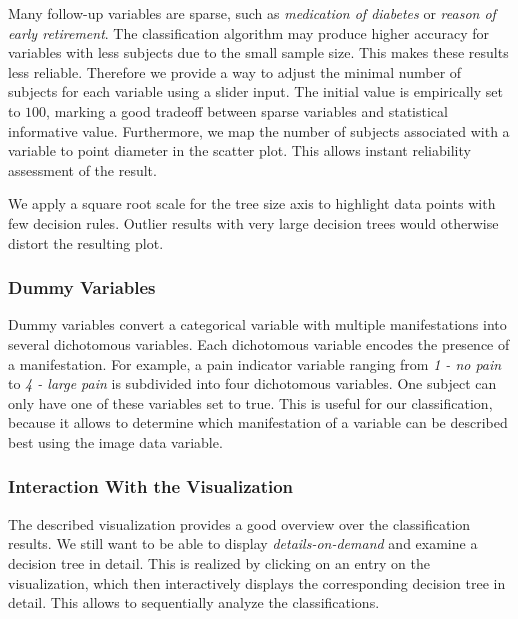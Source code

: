 \documentclass[a4paper,twoside]{style/article}
\newcommand{\com}[1]{\textcolor{orange}{\uline{#1}}}
\begin{document}
Many follow-up variables are sparse, such as \emph{medication of diabetes} or \emph{reason of early retirement}.
The classification algorithm may produce higher accuracy for variables with less subjects due to the small sample size.
This makes these results less reliable.
Therefore we provide a way to adjust the minimal number of subjects for each variable using a slider input.
The initial value is empirically set to $100$, marking a good tradeoff between sparse variables and statistical informative value.
Furthermore, we map the number of subjects associated with a variable to point diameter in the scatter plot.
This allows instant reliability assessment of the result.

We apply a square root scale for the tree size axis to highlight data points with few decision rules.
Outlier results with very large decision trees would otherwise distort the resulting plot.

%
\subsubsection{Dummy Variables}
Dummy variables convert a categorical variable with multiple manifestations into several dichotomous variables.
Each dichotomous variable encodes the presence of a manifestation.
For example, a pain indicator variable ranging from \emph{1 - no pain} to \emph{4 - large pain} is subdivided into four dichotomous variables. %
One subject can only have one of these variables set to true.
This is useful for our classification, because it allows to determine which manifestation of a variable can be described best using the image data variable.
\subsubsection{Interaction With the Visualization}
The described visualization provides a good overview over the classification results.
We still want to be able to display \emph{details-on-demand} \cite{shneiderman1996} and examine a decision tree in detail.
This is realized by clicking on an entry on the visualization, which then interactively displays the corresponding decision tree in detail.
This allows to sequentially analyze the classifications.
\end{document}
